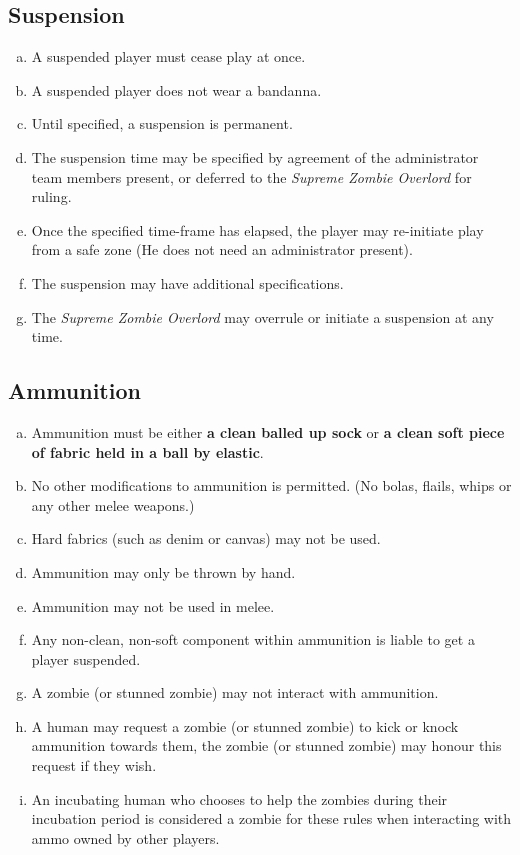 \documentclass[a4paper,12pt]{article}
\begin{document}
\subsection{Suspension}

\begin{enumerate}[(a)]
    \item A suspended player must cease play at once.
    \item A suspended player does not wear a bandanna.
    \item Until specified, a suspension is permanent.
    \item The suspension time may be specified by agreement of the administrator team members present, or deferred to the \emph{Supreme Zombie Overlord} for ruling.
    \item Once the specified time-frame has elapsed, the player may re-initiate play from a safe zone (He does not need an administrator present).
    \item The suspension may have additional specifications.
    \item The \emph{Supreme Zombie Overlord} may overrule or initiate a suspension at any time. 
\end{enumerate}

\subsection{Ammunition}
\begin{enumerate}[(a)]
    \item Ammunition must be either {\bf a clean balled up sock} or {\bf a clean soft piece of fabric held in a ball by elastic}.
    \item No other modifications to ammunition is permitted. (No bolas, flails, whips or any other melee weapons.)
    \item Hard fabrics (such as denim or canvas) may not be used.
    \item Ammunition may only be thrown by hand.
    \item Ammunition may not be used in melee.
    \item Any non-clean, non-soft component within ammunition is liable to get a player suspended.
    \item A zombie (or stunned zombie) may not interact with ammunition. 
    \item A human may request a zombie (or stunned zombie) to kick or knock ammunition towards them, the zombie (or stunned zombie) may honour this request if they wish.
    \item An incubating human who chooses to help the zombies during their incubation period is considered a zombie for these rules when interacting with ammo owned by other players. 
\end{enumerate}
\end{document}
